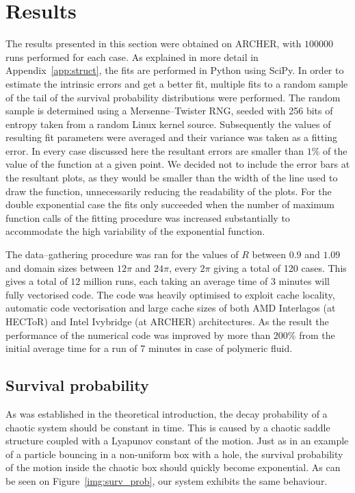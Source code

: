 \documentclass[11pt,a4paper]{article}
\begin{document}
\section{Results}
The results presented in this section were obtained on ARCHER, with $100000$ runs performed for each case.
As explained in more detail in Appendix~\ref{app:struct}, the fits are performed in Python using SciPy.
In order to estimate the intrinsic errors and get a better fit, multiple fits to a random sample of the tail of the survival probability distributions were performed.
The random sample is determined using a Mersenne--Twister RNG, seeded with 256 bits of entropy taken from a random Linux kernel source.
Subsequently the values of resulting fit parameters were averaged and their variance was taken as a fitting error.
In every case discussed here the resultant errors are smaller than $1\%$ of the value of the function at a given point.
We decided not to include the error bars at the resultant plots, as they would be smaller than the width of the line used to draw the function, unnecessarily reducing the readability of the plots.
For the double exponential case the fits only succeeded when the number of maximum function calls of the fitting procedure was increased substantially to accommodate the high variability of the exponential function.

The data--gathering procedure was ran for the values of $R$ between $0.9$ and $1.09$ and domain sizes between $12\pi$ and $24\pi$, every $2\pi$ giving a total of 120 cases.
This gives a total of $12$ million runs, each taking an average time of 3 minutes will fully vectorised code.
The code was heavily optimised to exploit cache locality, automatic code vectorisation and large cache sizes of both AMD Interlagos (at HECToR) and Intel Ivybridge (at ARCHER) architectures.
As the result the performance of the numerical code was improved by more than $200\%$ from the initial average time for a run of 7 minutes in case of polymeric fluid.


\subsection{Survival probability}
As was established in the theoretical introduction, the decay probability of a chaotic system should be constant in time.
This is caused by a chaotic saddle structure coupled with a Lyapunov constant of the motion.
Just as in an example of a particle bouncing in a non-uniform box with a hole, the survival probability of the motion inside the chaotic box should quickly become exponential.
As can be seen on Figure~\ref{img:surv_prob}, our system exhibits the same behaviour.
\end{document}
